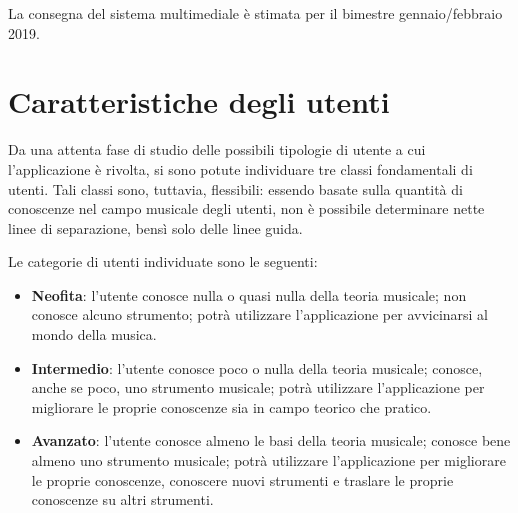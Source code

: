 La consegna del sistema multimediale è stimata per il bimestre gennaio/febbraio 2019.

\section{Caratteristiche degli utenti}
Da una attenta fase di studio delle possibili tipologie di utente a cui l'applicazione è rivolta, si sono potute individuare tre classi fondamentali di utenti. Tali classi sono, tuttavia, flessibili: essendo basate sulla quantità di conoscenze nel campo musicale degli utenti, non è possibile determinare nette linee di separazione, bensì solo delle linee guida.

Le categorie di utenti individuate sono le seguenti:
\begin{itemize}
	\item \textbf{Neofita}: l'utente conosce nulla o quasi nulla della teoria musicale; non conosce alcuno strumento; potrà utilizzare l'applicazione per avvicinarsi al mondo della musica.
	\item \textbf{Intermedio}: l'utente conosce poco o nulla della teoria musicale; conosce, anche se poco, uno strumento musicale; potrà utilizzare l'applicazione per migliorare le proprie conoscenze sia in campo teorico che pratico.
	\item \textbf{Avanzato}: l'utente conosce almeno le basi della teoria musicale; conosce bene almeno uno strumento musicale; potrà utilizzare l'applicazione per migliorare le proprie conoscenze, conoscere nuovi strumenti e traslare le proprie conoscenze su altri strumenti.
\end{itemize}

